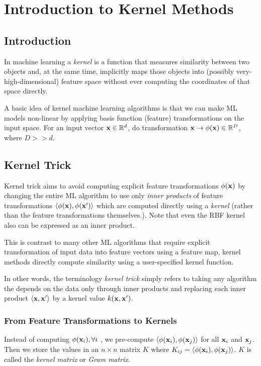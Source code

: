 \chapter{Introduction to Kernel Methods}

\section{Introduction}

In machine learning a \textit{kernel} is a function that measures similarity between two objects and, at the same time, implicitly maps those objects into (possibly very-high-dimensional) feature space without ever computing the coordinates of that space directly.

A basic idea of kernel machine learning algorithms is that we can make ML models non-linear by applying basis function (feature) transformations on the input space. For an input vector ${\mathbf{x}}\in \mathbb{R}^d$, do transformation ${\mathbf{x}} \to \phi({\mathbf{x}})\in \mathbb{R}^D$, where $D>>d$.

\section{Kernel Trick}
Kernel trick aims to avoid computing explicit feature transformations $\phi({\mathbf{x}})$ by changing the entire ML algorithm to use only \textit{inner products} of feature transformations $\langle \phi({\mathbf{x}}), \phi({\mathbf{x}}')\rangle$ which are computed directly using a \textit{kernel} (rather than the feature transformations themselves.). Note that even the RBF kernel also can be expressed as an inner product. 

This is contrast to many other ML algorithms that require explicit transformation of input data into feature vectors using a feature map, kernel methods directly compute similarity using a user-specified kernel function.

In other words, the terminology \textit{kernel trick} simply refers to taking any algorithm the depends on the data only through inner products and replacing each inner product $\left<{\mathbf{x}}, {\mathbf{x}}'\right>$ by a kernel value $k({\mathbf{x}}, {\mathbf{x}}')$.

\subsection{From Feature Transformations to Kernels}
Instead of computing $\phi({\mathbf{x}}_i), \forall i$ , we pre-compute $\langle \phi({\mathbf{x}}_i), \phi({\mathbf{x}}_j)\rangle$ for all ${\mathbf{x}}_i$ and ${\mathbf{x}}_j$. Then we store the values in an $n\times n$ matrix $K$ where $K_{ij}= \langle \phi({\mathbf{x}}_i), \phi({\mathbf{x}}_j)\rangle$. $K$ is called the \textit{kernel matrix} or \textit{Gram matrix}. 

